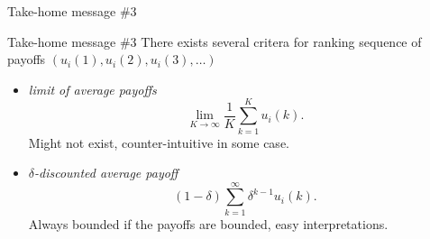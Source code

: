 \begin{frame}{Take-home message \#3}
    \begin{block}{Take-home message \#3}
        There exists several critera for ranking sequence of payoffs $(u_i(1), u_i(2), u_i(3), \dots)$
        \begin{itemize}
            \item \textit{limit of average payoffs}
            \[ \lim_{K\to\infty} \frac{1}{K} \sum_{k=1}^K u_i(k). \]
            {\color{orange}Might not exist, counter-intuitive in some case}.
            \item $\delta$\textit{-discounted average payoff}
            \[ (1-\delta)\sum_{k=1}^{\infty} \delta^{k-1}u_i(k). \]
            {\color{green}Always bounded if the payoffs are bounded, easy interpretations}. 
        \end{itemize}
    \end{block}
\end{frame}

